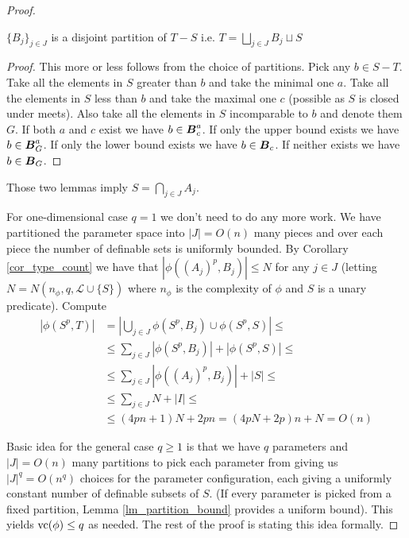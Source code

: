 \documentclass{amsart}
\DeclareMathOperator{\B}{\boldface B}
\renewcommand{\LL}{\mathcal L}
\begin{document}
\begin{proof}
	\begin{Lemma}
		$\{B_j\}_{j \in J}$ is a disjoint partition of $T - S$ i.e. $T = \bigsqcup_{j \in J} B_j \sqcup S$
	\end{Lemma}
	
	\begin{proof}
		This more or less follows from the choice of partitions. Pick any $b \in S - T$. Take all the elements in $S$ greater than $b$ and take the minimal one $a$. Take all the elements in $S$ less than $b$ and take the maximal one $c$ (possible as $S$ is closed under meets). Also take all the elements in $S$ incomparable to $b$ and denote them $G$. If both $a$ and $c$ exist we have $b \in \B^a_c$. If only the upper bound exists we have $b \in \B^a_G$. If only the lower bound exists we have $b \in \B_c$. If neither exists we have $b \in \B_G$.
	\end{proof}
	
	\begin{Note}
		Those two lemmas imply $S = \bigcap_{j \in J} A_j$.
	\end{Note}
	
	\begin{Note}
		For one-dimensional case $q = 1$ we don't need to do any more work. We have partitioned the parameter space into $|J| = O(n)$ many pieces and over each piece the number of definable sets is uniformly bounded. By Corollary \ref{cor_type_count} we have that $|\phi((A_j)^p, B_j)| \leq N$ for any $j \in J$ (letting $N = N(n_\phi, q, \LL \cup \{S\})$ where $n_\phi$ is the complexity of $\phi$ and $S$ is a unary predicate). Compute
		\begin{align*}
			|\phi(S^p, T)|
			&= \left|\bigcup_{j \in J} \phi(S^p, B_j) \cup \phi(S^p, S)\right| \leq \\
			&\leq \sum_{j \in J} |\phi(S^p, B_j)| + |\phi(S^p, S)| \leq \\
			&\leq \sum_{j \in J} |\phi((A_j)^p, B_j)| + |S| \leq \\
			&\leq \sum_{j \in J}N + |I| \leq \\
			&\leq (4pn + 1)N + 2pn = (4pN + 2p)n + N = O(n)
		\end{align*}
	\end{Note}
	Basic idea for the general case $q \geq 1$ is that we have $q$ parameters and $|J| = O(n)$ many partitions to pick each parameter from giving us $|J|^q = O(n^q)$ choices for the parameter configuration, each giving a uniformly constant number of definable subsets of $S$. (If every parameter is picked from a fixed partition, Lemma \ref{lm_partition_bound} provides a uniform bound). This yields $\operatorname{vc}(\phi) \leq q$ as needed. The rest of the proof is stating this idea formally.
	

\end{proof}
\end{document}
